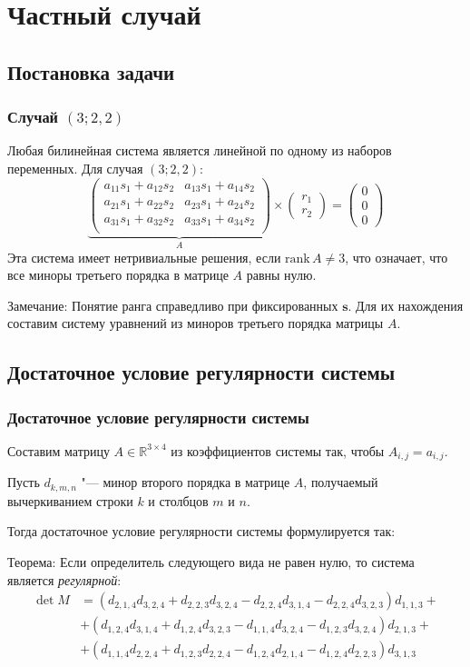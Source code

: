 \documentclass{beamer}
\begin{document}
\section{Частный случай}
\subsection{Постановка задачи}
\frame
{
	\frametitle{Случай $(3; 2, 2)$}
	Любая билинейная система является линейной по одному из наборов переменных. Для случая 	
	$(3;2, 2)$:
	$$
		\underbrace{
		\begin{pmatrix}
			a_{1 1} s_1 + a_{1 2} s_2 & a_{1 3} s_1 + a_{1 4} s_2 \\
			a_{2 1} s_1 + a_{2 2} s_2 & a_{2 3} s_1 + a_{2 4} s_2 \\
			a_{3 1} s_1 + a_{3 2} s_2 & a_{3 3} s_1 + a_{3 4} s_2 \\
		\end{pmatrix}}_{A}
		\times
		\begin{pmatrix}
			r_1 \\
			r_2
		\end{pmatrix}=
		\begin{pmatrix}
			0 \\
			0 \\
			0
		\end{pmatrix}
	$$
	Эта система имеет нетривиальные решения, если $\text{rank}\,A 
	\ne 3$, что означает, что все миноры третьего порядка в матрице $A$ равны нулю.
	\begin{alertblock}{Замечание:}
		Понятие ранга справедливо при фиксированных $\mathbf{s}$. Для их нахождения составим 
		систему уравнений из миноров третьего порядка матрицы $A$.
	\end{alertblock}
}
\subsection{Достаточное условие регулярности системы}
\frame
{
	\frametitle{Достаточное условие регулярности системы}
	Составим матрицу $A \in \mathbb{R}^{3 \times 4}$ из коэффициентов системы так, чтобы 
	$A_{i,j} = a_{i,j}$. 
	
	Пусть $d_{k, m, n}$ "--- минор второго порядка в матрице $A$, получаемый вычеркиванием строки $k$ 
	и столбцов $m$ и $n$.
	
	
	Тогда достаточное условие регулярности системы формулируется так: 
	\begin{block}{Теорема:}
		Если определитель следующего вида не равен нулю, то система является 
		\textit{регулярной}:
		\begin{align*}
		 	\det M & = (d_{2,1,4} d_{3,2,4} + d_{2,2,3} d_{3,2,4} - d_{2,2,4} d_{3,1,4} - 
		 	d_{2,2,4} d_{3,2,3}) d_{1,1,3} + \\
		 	& + (d_{1,2,4} d_{3,1,4} + d_{1,2,4} d_{3,2,3} - d_{1,1,4} d_{3,2,4} - d_{1,2,3}
		 	d_{3,2,4}) d_{2,1,3} + \\		 
		 	& + (d_{1,1,4} d_{2,2,4} + d_{1,2,3}d_{2,2,4} - d_{1,2,4}d_{2,1,4} - d_{1,2,4}
		 	d_{2,2,3}) d_{3,1,3}
		\end{align*} 
	\end{block}
}
\end{document}
